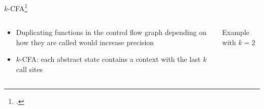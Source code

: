 \begin{frame}{$k$-CFA\footcite{shivers1991control}}
  \begin{columns}
  \begin{column}{0.5\textwidth}
  \begin{itemize}[<+->]
  \item Duplicating functions in the control flow graph depending on
    how they are called would increase precision
  \item $k$-CFA: each abstract state contains a context with the last
    $k$ call sites
  \end{itemize}
  \end{column}
  
  \begin{column}{0.5\textwidth}
  \begin{exampleblock}{Example with $k=2$}
  \end{exampleblock}
  \end{column}
  \end{columns}
\end{frame}

